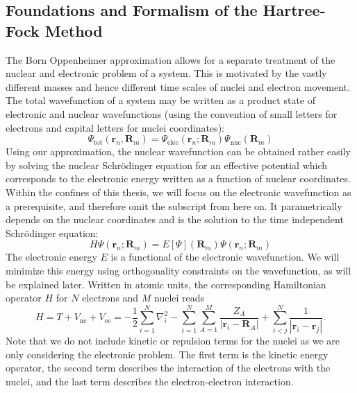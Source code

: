 \subsection{Foundations and Formalism of the Hartree-Fock Method}
\label{subsec:background_hf}
The Born Oppenheimer approximation allows for a separate treatment of the nuclear and electronic problem of a system. This is motivated by the vastly different masses and hence different time scales of nuclei and electron movement. The total wavefunction of a system may be written as a product state of electronic and nuclear wavefunctions (using the convention of small letters for electrons and capital letters for nuclei coordinates):
\begin{equation}
    \Psi_{\text{tot}}(\mathbf{r}_n, \mathbf{R}_m) = \Psi_{\text{elec}}(\mathbf{r}_n; \mathbf{R}_m) \Psi_{\text{nuc}}(\mathbf{R}_m)
\end{equation}
Using our approximation, the nuclear wavefunction can be obtained rather easily by solving the nuclear Schrödinger equation for an effective potential which corresponds to the electronic energy written as a function of nuclear coordinates.  
Within the confines of this thesis, we will focus on the electronic wavefunction as a prerequisite, and therefore omit the subscript from here on. It parametrically depends on the nuclear coordinates and is the solution to the time independent Schrödinger equation:
\begin{equation}
    H \Psi(\mathbf{r}_n; \mathbf{R}_m) = E[\Psi](\mathbf{R}_m) \Psi(\mathbf{r}_n; \mathbf{R}_m)
\end{equation}
The electronic energy $E$ is a functional of the electronic wavefunction. We will minimize this energy using orthogonality constraints on the wavefunction, as will be explained later. Written in atomic units, the corresponding Hamiltonian operator $H$ for $N$ electrons and $M$ nuclei reads
\begin{equation}
    H = T + V_{\text{ne}} + V_{\text{ee}} = -\frac{1}{2} \sum_{i=1}^N \nabla_i^2 - \sum_{i=1}^N \sum_{A=1}^M \frac{Z_A}{|\mathbf{r}_i - \mathbf{R}_A|} + \sum_{i<j}^N \frac{1}{|\mathbf{r}_i - \mathbf{r}_j|}.
\end{equation}
Note that we do not include kinetic or repulsion terms for the nuclei as we are only considering the electronic problem. The first term is the kinetic energy operator, the second term describes the interaction of the electrons with the nuclei, and the last term describes the electron-electron interaction.\\


